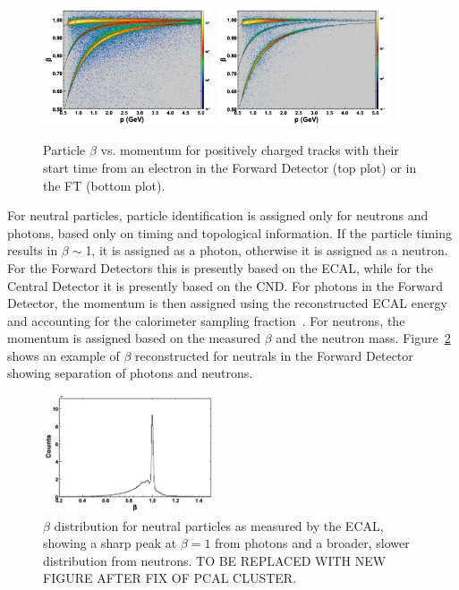 \begin{figure}[t]
\centering
\includegraphics[width=0.45\textwidth]{pics/ftof_betap.png}
\includegraphics[width=0.45\textwidth]{pics/ft_betap.png}
\caption{Particle $\beta$ vs. momentum for positively charged tracks with their start time from an electron in
the Forward Detector (top plot) or in the FT (bottom plot).}
\label{fig:betavsp}
\end{figure}

For neutral particles, particle identification is assigned only for neutrons and photons, based only on timing and
topological information. If the particle timing results in $\beta\sim$1, it is assigned as a photon, otherwise it
is assigned as a neutron. For the Forward Detectors this is presently based on the ECAL, while for the Central
Detector it is presently based on the CND. For photons in the Forward Detector, the momentum is then assigned
using the reconstructed ECAL energy and accounting for the calorimeter sampling fraction~\cite{ecal-nim}. For
neutrons, the momentum is assigned based on the measured $\beta$ and the neutron mass.
Figure~\ref{fig:neutbeta} shows an example of $\beta$ reconstructed for neutrals in the Forward Detector
showing separation of photons and neutrons.

\begin{figure}
\centering
\includegraphics[width=0.45\textwidth]{pics/neutral_beta.png}
\caption{$\beta$ distribution for neutral particles as measured by the ECAL, showing a sharp peak at $\beta=1$
  from photons and a broader, slower distribution from neutrons. TO BE REPLACED WITH NEW FIGURE AFTER
  FIX OF PCAL CLUSTER.}
\label{fig:neutbeta}
\end{figure}

